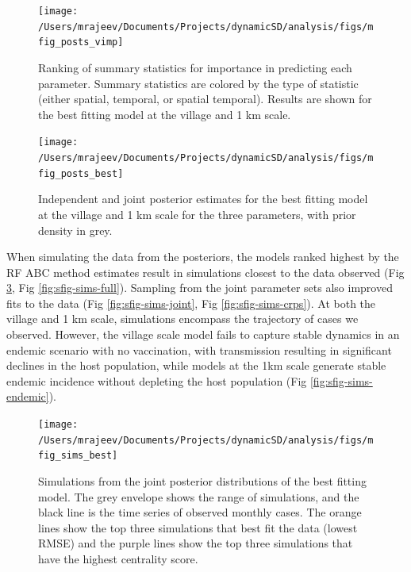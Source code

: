 \documentclass[
  oneside]{book}
\begin{document}
\begin{figure}
\texttt{[image: /Users/mrajeev/Documents/Projects/dynamicSD/analysis/figs/mfig\_posts\_vimp]} \caption[Ranking of summary statistics for importance in predicting each parameter.]{Ranking of summary statistics for importance in predicting each parameter. Summary statistics are colored by the type of statistic (either spatial, temporal, or spatial temporal). Results are shown for the best fitting model at the village and 1 km scale.}\label{fig:mfig-posts-vimp}
\end{figure}



\begin{figure}
\texttt{[image: /Users/mrajeev/Documents/Projects/dynamicSD/analysis/figs/mfig\_posts\_best]} \caption[Independent and joint posterior parameter estimates for the best fitting model across scales.]{Independent and joint posterior estimates for the best fitting model at the village and 1 km scale for the three parameters, with prior density in grey.}\label{fig:mfig-posts-best}
\end{figure}



When simulating the data from the posteriors, the models ranked highest by the RF ABC method estimates result in simulations closest to the data observed (Fig \ref{fig:mfig-sims-best}, Fig \ref{fig:sfig-sims-full}). Sampling from the joint parameter sets also improved fits to the data (Fig \ref{fig:sfig-sims-joint}, Fig \ref{fig:sfig-sims-crps}). At both the village and 1 km scale, simulations encompass the trajectory of cases we observed. However, the village scale model fails to capture stable dynamics in an endemic scenario with no vaccination, with transmission resulting in significant declines in the host population, while models at the 1km scale generate stable endemic incidence without depleting the host population (Fig \ref{fig:sfig-sims-endemic}).

\begin{figure}
\texttt{[image: /Users/mrajeev/Documents/Projects/dynamicSD/analysis/figs/mfig\_sims\_best]} \caption[Simulations from the joint posterior distributions of the best fitting model.]{Simulations from the joint posterior distributions of the best fitting model. The grey envelope shows the range of simulations, and the black line is the time series of observed monthly cases. The orange lines show the top three simulations that best fit the data (lowest RMSE) and the purple lines show the top three simulations that have the highest centrality score.}\label{fig:mfig-sims-best}
\end{figure}
\end{document}
